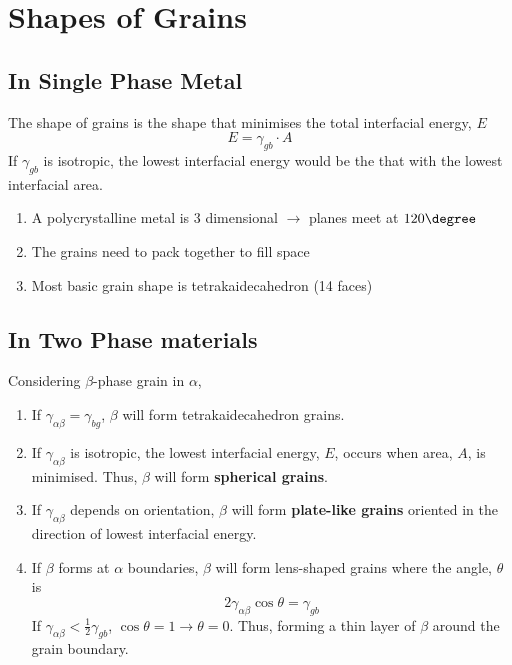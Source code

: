 \section{Shapes of Grains}
\subsection{In Single Phase Metal} %
\label{sub:in_single_phase_metal}

The shape of grains is the shape that minimises the total interfacial energy, $E$
\begin{equation}
  E = \gamma_{gb}\cdot A
\end{equation}
If $\gamma_{gb}$ is isotropic, the lowest interfacial energy would be the that with the lowest interfacial area.
\begin{enumerate}
  \item A polycrystalline metal is 3 dimensional $\rightarrow$ planes meet at $120\degree$
  \item The grains need to pack together to fill space
  \item Most basic grain shape is tetrakaidecahedron (14 faces)
\end{enumerate}

\subsection{In Two Phase materials} %
\label{sub:in_two_phase_materials}
Considering $\beta$-phase grain in $\alpha$,
\begin{enumerate}
  \item If $\gamma_{\alpha\beta} = \gamma_{bg}$, $\beta$ will form tetrakaidecahedron grains.
  \item If $\gamma_{\alpha\beta}$ is isotropic, the lowest interfacial energy, $E$, occurs when area, $A$, is minimised. Thus, $\beta$ will form \textbf{spherical grains}.
  \item If $\gamma_{\alpha\beta}$ depends on orientation, $\beta$ will form \textbf{plate-like grains} oriented in the direction of lowest interfacial energy.
  \item If $\beta$ forms at $\alpha$ boundaries, $\beta$ will form lens-shaped grains where the angle, $\theta$ is
  \begin{equation}
    2\gamma_{\alpha\beta}\cos\theta = \gamma_{gb}
  \end{equation}
  If $\gamma_{\alpha\beta} < \frac{1}{2}\gamma_{gb}$, $\cos\theta = 1 \rightarrow \theta = 0$. Thus, forming a thin layer of $\beta$ around the grain boundary.
\end{enumerate}
